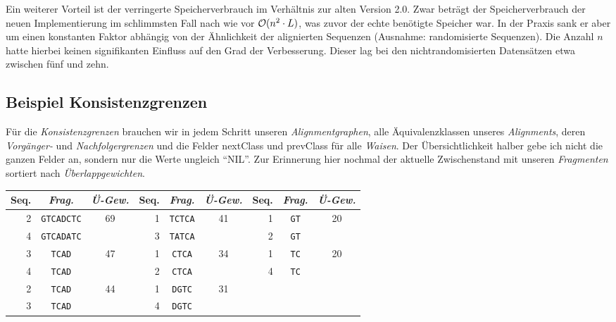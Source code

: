 Ein weiterer Vorteil ist der verringerte Speicherverbrauch im Verhältnis zur alten Version 2.0. Zwar beträgt der Speicherverbrauch der neuen Implementierung im schlimmsten Fall nach wie vor $\mathcal{O}(n^2\cdot L)$, was zuvor der echte benötigte Speicher war. In der Praxis sank er aber um einen konstanten Faktor abhängig von der Ähnlichkeit der alignierten Sequenzen (Ausnahme: randomisierte Sequenzen). Die Anzahl $n$ hatte hierbei keinen signifikanten Einfluss auf den Grad der Verbesserung. Dieser lag bei den nichtrandomisierten Datensätzen etwa zwischen fünf und zehn.

\subsection{Beispiel Konsistenzgrenzen}

Für die \emph{Konsistenzgrenzen} brauchen wir in jedem Schritt unseren \emph{Alignmentgraphen}, alle Äquivalenzklassen unseres \emph{Alignments}, deren \emph{Vorgänger-} und \emph{Nachfolgergrenzen} und die Felder \textrm{nextClass} und \textrm{prevClass} für alle  \emph{Waisen}. Der Übersichtlichkeit halber gebe ich nicht die ganzen Felder an, sondern nur die Werte ungleich \enquote{NIL}. Zur Erinnerung hier nochmal der aktuelle Zwischenstand mit unseren \emph{Fragmenten} sortiert nach \emph{Überlappgewichten}.

\begin{tabular}{r|c|c||r|c|c||r|c|c}
	Seq. & \emph{Frag.} & \emph{Ü-Gew.} & Seq. & \emph{Frag.} & \emph{Ü-Gew.} & Seq. & \emph{Frag.} & \emph{Ü-Gew.}\\
	\hline
	2 & \texttt{GTCADCTC} & \multirow{2}{*}{69} & 1 & \texttt{TCTCA} & \multirow{2}{*}{41} & 1 & \texttt{GT} &\multirow{2}{*}{20} \\
	4 & \texttt{GTCADATC} &                     & 3 & \texttt{TATCA} &                     & 2 & \texttt{GT} & \\
	3 & \texttt{TCAD} & \multirow{2}{*}{47} & 1 & \texttt{CTCA} & \multirow{2}{*}{34} & 1 & \texttt{TC} & \multirow{2}{*}{20} \\
	4 & \texttt{TCAD} &                     & 2 & \texttt{CTCA} &                          & 4 & \texttt{TC} & \\
	2 & \texttt{TCAD} & \multirow{2}{*}{44} & 1 & \texttt{DGTC} & \multirow{2}{*}{31} &    &   & \\
	3 & \texttt{TCAD} &                     & 4 & \texttt{DGTC} &                     &    &   & \\
\end{tabular}

